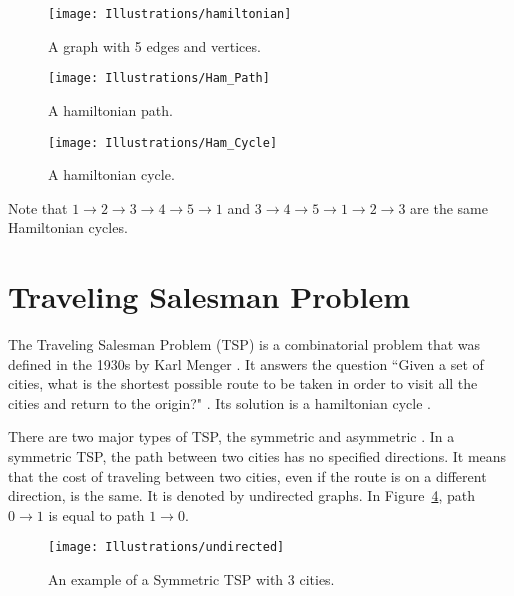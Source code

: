 \begin{figure}[H]
	\caption{A graph with 5 edges and vertices.}
	\texttt{[image: Illustrations/hamiltonian]}
	\centering
	\label{fig:Hamiltonian}
\end{figure}


\begin{figure}[H]
	\caption{A hamiltonian path.}
	\texttt{[image: Illustrations/Ham\_Path]}
	\centering
	\label{fig:HamPath}
\end{figure}



\begin{figure}[H]
	\caption{A hamiltonian cycle.}
	\texttt{[image: Illustrations/Ham\_Cycle]}
	\centering
	\label{fig:HamCycle}
\end{figure}


Note that $ 1 \rightarrow 2 \rightarrow 3 \rightarrow 4 \rightarrow  5 \rightarrow 1$ and $ 3 \rightarrow 4 \rightarrow 5 \rightarrow 1 \rightarrow 2 \rightarrow 3$ are the same Hamiltonian cycles.

\section{Traveling Salesman Problem}
\indent \indent The Traveling Salesman Problem (TSP) is a combinatorial problem that was defined in the 1930s by Karl Menger \cite{salvador2010traveling}. It answers the question ``Given a set of cities, what is the shortest possible route to be taken in order to visit all the cities and return to the origin?" \cite{papadimitriou1977euclidean}.  Its solution is a hamiltonian cycle \cite{brucato2013traveling}. \par 

There are two major types of TSP, the symmetric and asymmetric \cite{matai2010traveling}. In a symmetric TSP, the path between two cities has no specified directions. It means that the cost of traveling between two cities, even if the route is on a different direction, is the same. It is denoted by undirected graphs. In Figure~\ref{fig:SymmetricTSP}, path $0 \rightarrow 1$ is equal to path $1 \rightarrow 0$. \par 

\begin{figure}[H]
	\caption{An example of a Symmetric TSP with 3 cities.}
	\texttt{[image: Illustrations/undirected]}
	\centering
	\label{fig:SymmetricTSP}
\end{figure}

